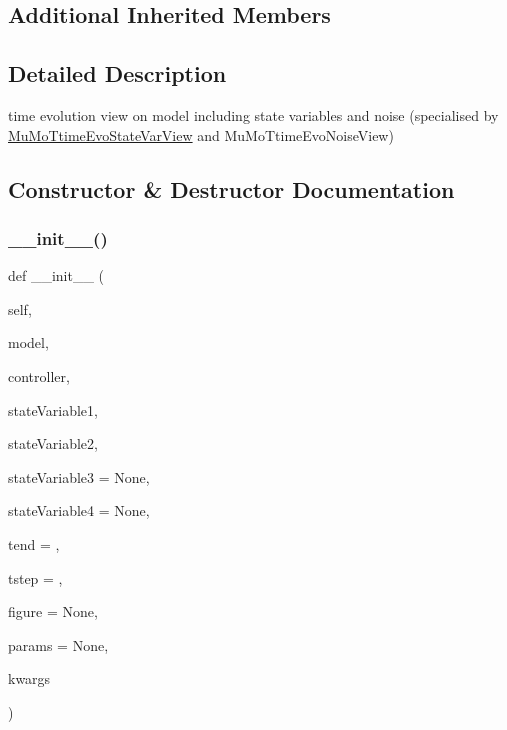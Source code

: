 \subsection*{Additional Inherited Members}


\subsection{Detailed Description}
time evolution view on model including state variables and noise (specialised by \hyperlink{class_mu_mo_t_1_1_mu_mo_t_1_1_mu_mo_ttime_evo_state_var_view}{Mu\+Mo\+Ttime\+Evo\+State\+Var\+View} and Mu\+Mo\+Ttime\+Evo\+Noise\+View) 

\subsection{Constructor \& Destructor Documentation}
\mbox{\label{class_mu_mo_t_1_1_mu_mo_t_1_1_mu_mo_ttime_evolution_view_a5e770e35882c7ca31a269958f19a6850}} 
\subsubsection{\texorpdfstring{\+\_\+\+\_\+init\+\_\+\+\_\+()}{\_\_init\_\_()}}
{\footnotesize\ttfamily def \+\_\+\+\_\+init\+\_\+\+\_\+ (\begin{DoxyParamCaption}\item[{}]{self,  }\item[{}]{model,  }\item[{}]{controller,  }\item[{}]{state\+Variable1,  }\item[{}]{state\+Variable2,  }\item[{}]{state\+Variable3 = {\ttfamily None},  }\item[{}]{state\+Variable4 = {\ttfamily None},  }\item[{}]{tend = {},  }\item[{}]{tstep = {},  }\item[{}]{figure = {\ttfamily None},  }\item[{}]{params = {\ttfamily None},  }\item[{}]{kwargs }\end{DoxyParamCaption})}



